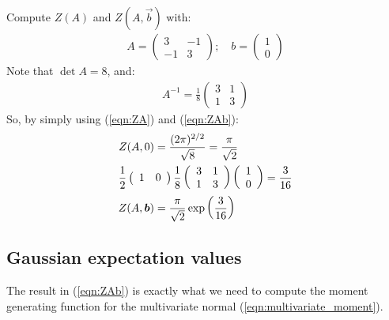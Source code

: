 \documentclass[../template.tex]{subfiles}
\begin{document}
\begin{exo}
    Compute $Z(A)$ and $Z(A,\vec{b})$ with:
    \begin{align*}
        A = \left(\begin{array}{cc}
        3 & -1 \\ 
        -1 & 3
        \end{array}\right); \quad b = \left(\begin{array}{c}
        1 \\ 
        0
        \end{array}\right)
    \end{align*}   
    Note that $\operatorname{det}A = 8$, and:
    \begin{align*}
        A^{-1} = \frac{1}{8} \left(\begin{array}{cc}
        3 & 1 \\ 
        1 & 3
        \end{array}\right) 
    \end{align*} 
    So, by simply using (\ref{eqn:ZA}) and (\ref{eqn:ZAb}):
    \begin{align*}
        Z(A,0) &= \frac{(2\pi)^{2/2}}{\sqrt{8}} = \frac{\pi}{\sqrt{2}} \\
        \span \frac{1}{2} \left(\begin{array}{cc}
        1 & 0
        \end{array}\right) \frac{1}{8} \left(\begin{array}{cc}
        3 & 1 \\ 
        1 & 3
        \end{array}\right) \left(\begin{array}{c}
        1 \\ 
        0
        \end{array}\right) = \frac{3}{16} \\
        Z(A, \bm{b}) &= \frac{\pi}{\sqrt{2}} \exp\left(\frac{3}{16} \right)   
    \end{align*}
\end{exo}

\subsection{Gaussian expectation values}
The result in (\ref{eqn:ZAb}) is exactly what we need to compute the moment generating function for the multivariate normal (\ref{eqn:multivariate_moment}).\\
\end{document}
